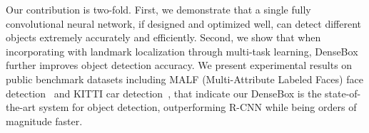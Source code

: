 Our contribution is two-fold. First, we demonstrate that a single fully convolutional neural network, if designed and optimized well, can detect different objects extremely accurately and efficiently. Second, we show that when incorporating with landmark localization through multi-task learning, DenseBox further improves object detection accuracy. We present experimental results on public benchmark datasets including MALF (Multi-Attribute Labeled Faces) face detection~\cite{faceevaluation15} and KITTI car detection~\cite{Geiger2012CVPR}, that indicate our DenseBox is the state-of-the-art system for object detection, outperforming R-CNN while being orders of magnitude faster.




